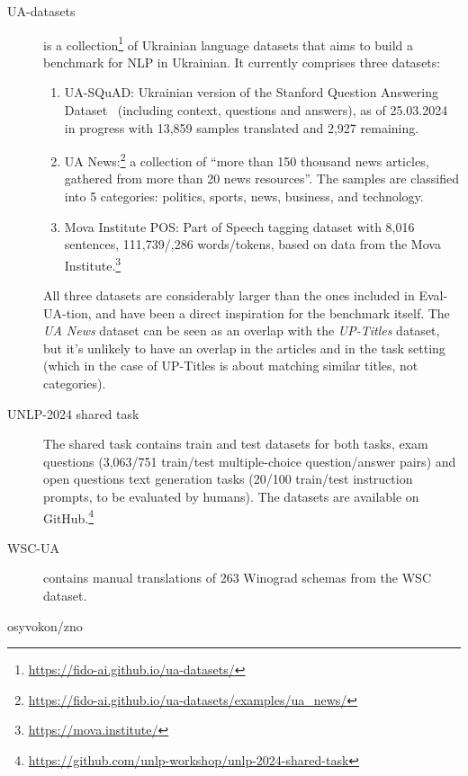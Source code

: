 \begin{description}
    \item[UA-datasets~\cite{ua_datasets_2021}] is a collection\footnote{\href{https://fido-ai.github.io/ua-datasets/}{https://fido-ai.github.io/ua-datasets/}} of Ukrainian language datasets that aims to build a benchmark for NLP in Ukrainian. It currently comprises three datasets: 
    \begin{enumerate}
        \tightlist
        \item UA-SQuAD: Ukrainian version of the Stanford Question Answering Dataset~\cite{rajpurkar_know_2018} (including context, questions and answers), as of 25.03.2024 in progress with 13,859 samples translated and 2,927 remaining.
        \item UA News:\footnote{\href{https://fido-ai.github.io/ua-datasets/examples/ua\_news/}{https://fido-ai.github.io/ua-datasets/examples/ua\_news/}} a collection of ``more than 150 thousand news articles, gathered from more than 20 news resources''. The samples are classified into 5 categories: politics, sports, news, business, and technology. 
        \item Mova Institute POS: Part of Speech tagging dataset with 8,016 sentences, 111,739/,286 words/tokens, based on data from the Mova Institute.\footnote{\href{https://mova.institute/}{https://mova.institute/}}
    \end{enumerate}
    All three datasets are considerably larger than the ones included in Eval-UA-tion, and have been a direct inspiration for the benchmark itself. 
    The \textit{UA News} dataset can be seen as an overlap with the \textit{UP-Titles} dataset, but it's unlikely to have an overlap in the articles and in the task setting (which in the case of UP-Titles is about matching similar titles, not categories).
    \item[UNLP-2024 shared task] The shared task contains train and test datasets for both tasks, exam questions (3,063/751 train/test multiple-choice question/answer pairs) and open questions text generation tasks (20/100 train/test instruction prompts, to be evaluated by humans). The datasets are available 
    on GitHub.\footnote{\href{https://github.com/unlp-workshop/unlp-2024-shared-task}{https://github.com/unlp-workshop/unlp-2024-shared-task}}
    \item[WSC-UA~\cite{kuchmiichuk-2023-silver}] contains manual translations of 263 Winograd schemas from the WSC~\cite{winograd} dataset.
    \item[osyvokon/zno] 

\end{description}
